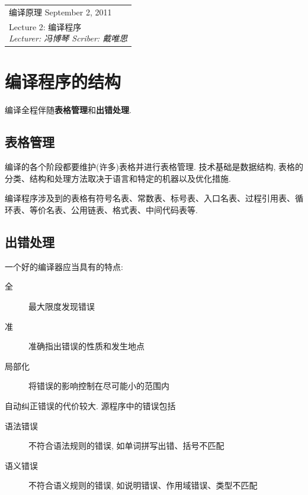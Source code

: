 \def\lecture{2}
\clearpage \noindent\begin{tabularx}{\linewidth}{|X|}
\hline \vskip -2mm
{\sf 编译原理} \hfill September 2, 2011 \\
{\centering \sf \large Lecture \lecture:
编译程序 \\ }
\textsl{Lecturer: 冯博琴 \hfill Scriber: 戴唯思}\\ \hline
\end{tabularx}
\setcounter{section}{0}
\renewcommand{\thepage}{\lecture -\arabic{page}}

\section{编译程序的结构}

    编译全程伴随\textbf{表格管理}和\textbf{出错处理}.

    \subsection{表格管理}

        编译的各个阶段都要维护(许多)表格并进行表格管理. 技术基础是数据结构, 表格的分类、结构和处理方法取决于语言和特定的机器以及优化措施.

        编译程序涉及到的表格有符号名表、常数表、标号表、入口名表、过程引用表、循环表、等价名表、公用链表、格式表、中间代码表等.

    \subsection{出错处理}
        
        一个好的编译器应当具有的特点:
        \begin{description}
            \item[全] 最大限度发现错误
            \item[准] 准确指出错误的性质和发生地点
            \item[局部化] 将错误的影响控制在尽可能小的范围内
        \end{description}

        自动纠正错误的代价较大. 源程序中的错误包括
        \begin{description}
            \item[语法错误] 不符合语法规则的错误, 如单词拼写出错、括号不匹配
            \item[语义错误] 不符合语义规则的错误, 如说明错误、作用域错误、类型不匹配
        \end{description}

